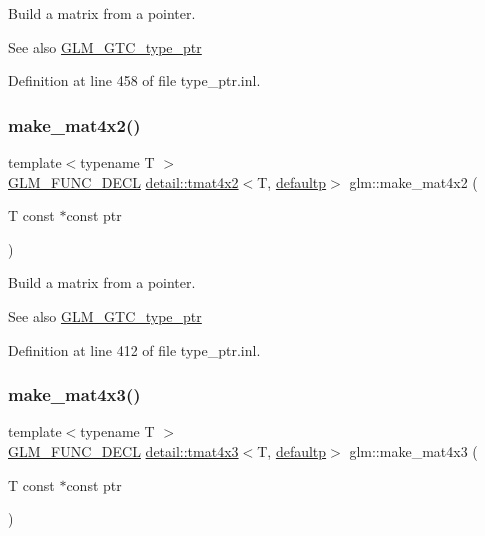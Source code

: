 Build a matrix from a pointer. \begin{DoxySeeAlso}{See also}
\hyperlink{group__gtc__type__ptr}{G\+L\+M\+\_\+\+G\+T\+C\+\_\+type\+\_\+ptr} 
\end{DoxySeeAlso}


Definition at line 458 of file type\+\_\+ptr.\+inl.

\mbox{\label{group__gtc__type__ptr_gae4ad99adfe4fb195a192712a71de901d}} 
\subsubsection{\texorpdfstring{make\+\_\+mat4x2()}{make\_mat4x2()}}
{\footnotesize\ttfamily template$<$typename T $>$ \\
\hyperlink{setup_8hpp_ab2d052de21a70539923e9bcbf6e83a51}{G\+L\+M\+\_\+\+F\+U\+N\+C\+\_\+\+D\+E\+CL} \hyperlink{structglm_1_1detail_1_1tmat4x2}{detail\+::tmat4x2}$<$T, \hyperlink{namespaceglm_a0f04f086094c747d227af4425893f545a9d21ccd8b5a009ec7eb7677befc3bf51}{defaultp}$>$ glm\+::make\+\_\+mat4x2 (\begin{DoxyParamCaption}\item[{T const $\ast$const}]{ptr }\end{DoxyParamCaption})}

Build a matrix from a pointer. \begin{DoxySeeAlso}{See also}
\hyperlink{group__gtc__type__ptr}{G\+L\+M\+\_\+\+G\+T\+C\+\_\+type\+\_\+ptr} 
\end{DoxySeeAlso}


Definition at line 412 of file type\+\_\+ptr.\+inl.

\mbox{\label{group__gtc__type__ptr_ga37ec66362c22d86ad2ee11930b638c4a}} 
\subsubsection{\texorpdfstring{make\+\_\+mat4x3()}{make\_mat4x3()}}
{\footnotesize\ttfamily template$<$typename T $>$ \\
\hyperlink{setup_8hpp_ab2d052de21a70539923e9bcbf6e83a51}{G\+L\+M\+\_\+\+F\+U\+N\+C\+\_\+\+D\+E\+CL} \hyperlink{structglm_1_1detail_1_1tmat4x3}{detail\+::tmat4x3}$<$T, \hyperlink{namespaceglm_a0f04f086094c747d227af4425893f545a9d21ccd8b5a009ec7eb7677befc3bf51}{defaultp}$>$ glm\+::make\+\_\+mat4x3 (\begin{DoxyParamCaption}\item[{T const $\ast$const}]{ptr }\end{DoxyParamCaption})}

